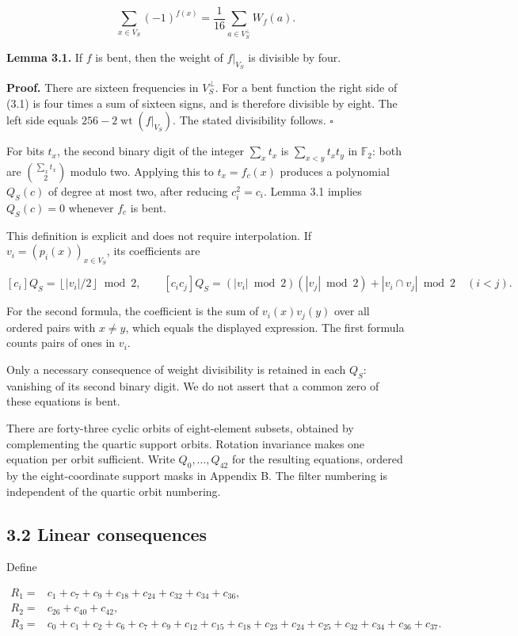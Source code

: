 \documentclass[11pt,a4paper]{article}
\begin{document}
\[
\sum_{x\in V_S}(-1)^{f(x)}=\frac1{16}\sum_{a\in V_S^\perp}W_f(a). \tag{3.1}
\]

\textbf{Lemma 3.1.} If $f$ is bent, then the weight of $f|_{V_S}$ is divisible by four.

\textbf{Proof.} There are sixteen frequencies in $V_S^\perp$. For a bent function the right side of (3.1) is four times a sum of sixteen signs, and is therefore divisible by eight. The left side equals $256-2\operatorname{wt}(f|_{V_S})$. The stated divisibility follows. \hfill$\square$

For bits $t_x$, the second binary digit of the integer $\sum_x t_x$ is
$\sum_{x<y}t_xt_y$ in $\mathbb F_2$: both are $\binom{\sum_x t_x}{2}$ modulo two. Applying this to $t_x=f_c(x)$ produces a polynomial $Q_S(c)$ of degree at most two, after reducing $c_i^2=c_i$. Lemma 3.1 implies $Q_S(c)=0$ whenever $f_c$ is bent.

This definition is explicit and does not require interpolation. If $v_i=(p_i(x))_{x\in V_S}$, its coefficients are

\[
[c_i]Q_S=\left\lfloor |v_i|/2\right\rfloor\bmod2,
\qquad
[c_ic_j]Q_S=(|v_i|\bmod2)(|v_j|\bmod2)+|v_i\cap v_j|\bmod2\quad(i<j). \tag{3.2}
\]

For the second formula, the coefficient is the sum of $v_i(x)v_j(y)$ over all ordered pairs with $x\ne y$, which equals the displayed expression. The first formula counts pairs of ones in $v_i$.

Only a necessary consequence of weight divisibility is retained in each $Q_S$: vanishing of its second binary digit. We do not assert that a common zero of these equations is bent.

There are forty-three cyclic orbits of eight-element subsets, obtained by complementing the quartic support orbits. Rotation invariance makes one equation per orbit sufficient. Write $Q_0,\ldots,Q_{42}$ for the resulting equations, ordered by the eight-coordinate support masks in Appendix B. The filter numbering is independent of the quartic orbit numbering.

\subsection*{3.2 Linear consequences}

Define

\[
\begin{aligned}
R_1={}&c_1+c_7+c_9+c_{18}+c_{24}+c_{32}+c_{34}+c_{36},\\
R_2={}&c_{26}+c_{40}+c_{42},\\
R_3={}&c_0+c_1+c_2+c_6+c_7+c_9+c_{12}+c_{15}+c_{18}
       +c_{23}+c_{24}+c_{25}+c_{32}+c_{34}+c_{36}+c_{37}.
\end{aligned} \tag{3.3}
\]
\end{document}
